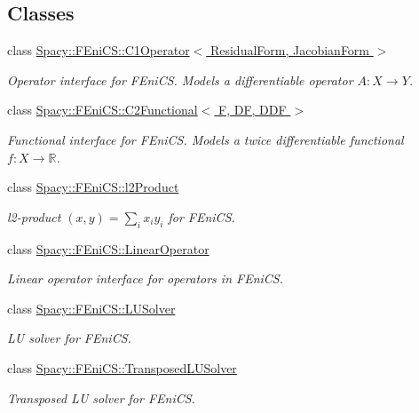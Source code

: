 \subsection*{Classes}
\begin{DoxyCompactItemize}
\item 
class \hyperlink{classSpacy_1_1FEniCS_1_1C1Operator}{Spacy\+::\+F\+Eni\+C\+S\+::\+C1\+Operator$<$ Residual\+Form, Jacobian\+Form $>$}
\begin{DoxyCompactList}\small\item\em Operator interface for F\+Eni\+C\+S. Models a differentiable operator $A:X\rightarrow Y$. \end{DoxyCompactList}\item 
class \hyperlink{classSpacy_1_1FEniCS_1_1C2Functional}{Spacy\+::\+F\+Eni\+C\+S\+::\+C2\+Functional$<$ F, D\+F, D\+D\+F $>$}
\begin{DoxyCompactList}\small\item\em Functional interface for F\+Eni\+C\+S. Models a twice differentiable functional $f:X\rightarrow \mathbb{R}$. \end{DoxyCompactList}\item 
class \hyperlink{classSpacy_1_1FEniCS_1_1l2Product}{Spacy\+::\+F\+Eni\+C\+S\+::l2\+Product}
\begin{DoxyCompactList}\small\item\em l2-\/product $(x,y) = \sum_i x_i y_i $ for F\+Eni\+C\+S. \end{DoxyCompactList}\item 
class \hyperlink{classSpacy_1_1FEniCS_1_1LinearOperator}{Spacy\+::\+F\+Eni\+C\+S\+::\+Linear\+Operator}
\begin{DoxyCompactList}\small\item\em Linear operator interface for operators in F\+Eni\+C\+S. \end{DoxyCompactList}\item 
class \hyperlink{classSpacy_1_1FEniCS_1_1LUSolver}{Spacy\+::\+F\+Eni\+C\+S\+::\+L\+U\+Solver}
\begin{DoxyCompactList}\small\item\em L\+U solver for F\+Eni\+C\+S. \end{DoxyCompactList}\item 
class \hyperlink{classSpacy_1_1FEniCS_1_1TransposedLUSolver}{Spacy\+::\+F\+Eni\+C\+S\+::\+Transposed\+L\+U\+Solver}
\begin{DoxyCompactList}\small\item\em Transposed L\+U solver for F\+Eni\+C\+S. \end{DoxyCompactList}\item 

\end{DoxyCompactItemize}
